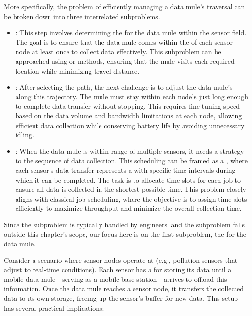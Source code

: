 \documentclass[a4paper, 12pt]{report}
\begin{document}
    More specifically, the problem of efficiently managing a data mule's traversal can be broken down into three interrelated subproblems.

    \begin{itemize}
        \item {}: This step involves determining the  for the data mule within the sensor field. The goal is to ensure that the data mule comes within the  of each sensor node at least once to collect data effectively. This subproblem can be approached using  or  methods, ensuring that the mule visits each required location while minimizing travel distance.
        \item {}: After selecting the path, the next challenge is to adjust the data mule's  along this trajectory. The mule must stay within each node's  just long enough to complete data transfer without stopping. This requires fine-tuning speed based on the data volume and bandwidth limitations at each node, allowing efficient data collection while conserving battery life by avoiding unnecessary idling.
        \item {}: When the data mule is within range of multiple sensors, it needs a strategy to  the sequence of data collection. This scheduling can be framed as a , where each sensor's data transfer represents a  with specific time intervals during which it can be completed. The task is to allocate time slots for each job to ensure all data is collected in the shortest possible time. This problem closely aligns with classical job scheduling, where the objective is to assign time slots efficiently to maximize throughput and minimize the overall collection time.
    \end{itemize}

    Since the  subproblem is typically handled by engineers, and the  subproblem falls outside this chapter's scope, our focus here is on the first subproblem, the  for the data mule.

    Consider a scenario where sensor nodes operate at  (e.g., pollution sensors that adjust to real-time conditions). Each sensor has a  for storing its data until a mobile data mule—serving as a mobile base station—arrives to offload this information. Once the data mule reaches a sensor node, it transfers the collected data to its own storage, freeing up the sensor's buffer for new data. This setup has several practical implications:
\end{document}
